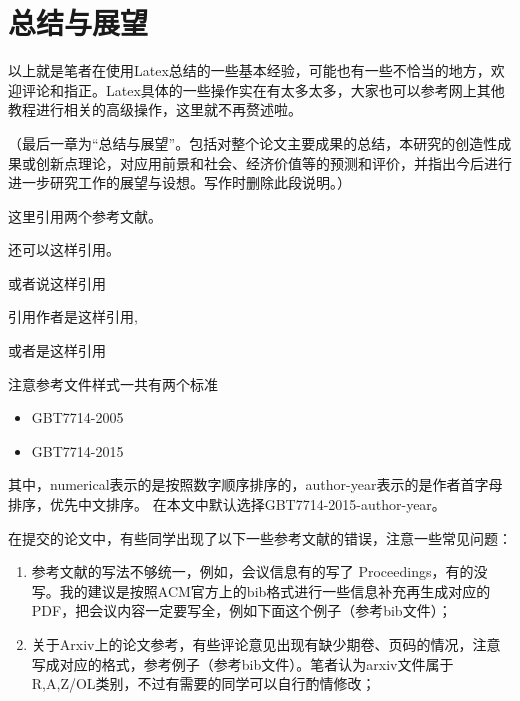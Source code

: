 \chapter{总结与展望}


以上就是笔者在使用Latex总结的一些基本经验，可能也有一些不恰当的地方，欢迎评论和指正。Latex具体的一些操作实在有太多太多，大家也可以参考网上其他教程进行相关的高级操作，这里就不再赘述啦。

（最后一章为“总结与展望”。包括对整个论文主要成果的总结，本研究的创造性成果或创新点理论，对应用前景和社会、经济价值等的预测和评价，并指出今后进行进一步研究工作的展望与设想。写作时删除此段说明。）

这里引用两个参考文献\cite{2001Applying}\cite{2004PSO_ZhangLibiao}。

还可以这样引用\cite{2001Applying,2021A}。

或者说这样引用\cite{2001Applying,2004PSO_ZhangLibiao,2021A}

引用作者是这样引用\citet{2001Applying},\citet{2004PSO_ZhangLibiao}

或者是这样引用\citep{2001Applying}

注意参考文件样式一共有两个标准

\begin{itemize}
    \item GBT7714-2005
    \item GBT7714-2015
\end{itemize}

其中，numerical表示的是按照数字顺序排序的，author-year表示的是作者首字母排序，优先中文排序。
在本文中默认选择GBT7714-2015-author-year。

在提交的论文中，有些同学出现了以下一些参考文献的错误，注意一些常见问题：
\begin{enumerate}
    \item 参考文献的写法不够统一，例如，会议信息有的写了 Proceedings，有的没写。我的建议是按照ACM官方上的bib格式进行一些信息补充再生成对应的PDF，把会议内容一定要写全，例如下面这个例子\citet{zheng-etal-2017-joint}（参考bib文件）；
    \item 关于Arxiv上的论文参考，有些评论意见出现有缺少期卷、页码的情况，注意写成对应的格式，参考例子\citet{wang2023instructuie}（参考bib文件）。笔者认为arxiv文件属于R,A,Z/OL类别，不过有需要的同学可以自行酌情修改；
\end{enumerate}
